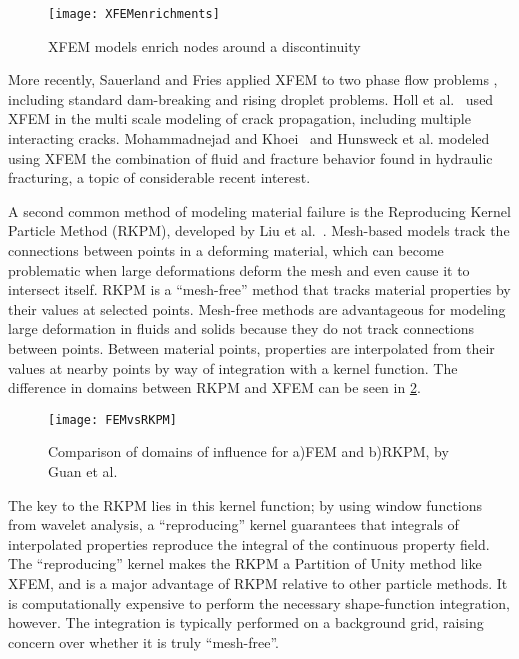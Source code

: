%
\begin{figure}[h]
  \centering
\texttt{[image: XFEMenrichments]}
\caption[XFEM models enrich nodes around a discontinuity]{XFEM models enrich nodes around a discontinuity\cite{fries2010extended}}
\label{fig:XFEM}
\end{figure}
%

More recently, Sauerland and Fries applied XFEM to two phase flow problems \cite{sauerland2013stable}, including standard dam-breaking and rising droplet problems.
Holl et al.~\cite{holl2013adaptive} used XFEM in the multi scale modeling of crack propagation, including multiple interacting cracks.
Mohammadnejad and Khoei~\cite{mohammadnejad2013hydro} and Hunsweck et al. \cite{hunsweck2013finite} modeled using XFEM the combination of fluid and fracture behavior found in hydraulic fracturing, a topic of considerable recent interest.

A second common method of modeling material failure is the Reproducing Kernel Particle Method (RKPM), developed by Liu et al.~\cite{liu1995reproducing}.
Mesh-based models track the connections between points in a deforming material, which can become problematic when large deformations deform the mesh and even cause it to intersect itself.
RKPM is a ``mesh-free'' method that tracks material properties by their values at selected points.
Mesh-free methods are advantageous for modeling large deformation in fluids and solids because they do not track connections between points.
Between material points, properties are interpolated from their values at nearby points by way of integration with a kernel function.
The difference in domains between RKPM and XFEM can be seen in \cref{fig:FEMvsRKPM}.
%
\begin{figure}[h]
  \centering
\texttt{[image: FEMvsRKPM]}
\caption[Comparison of domains of influence for FEM and RKPM]{Comparison of domains of influence for a)FEM and b)RKPM, by Guan et al. \cite{guan2011semi}}
\label{fig:FEMvsRKPM}
\end{figure}
%
The key to the RKPM lies in this kernel function; by using window functions from wavelet analysis, a ``reproducing'' kernel guarantees that  integrals of interpolated properties reproduce the integral of the continuous property field.
The ``reproducing'' kernel makes the RKPM a Partition of Unity method like XFEM, and is a major advantage of RKPM relative to other particle methods.
It is computationally expensive to perform the necessary shape-function integration, however.
The integration is typically performed on a background grid, raising concern over whether it is truly ``mesh-free''. 

